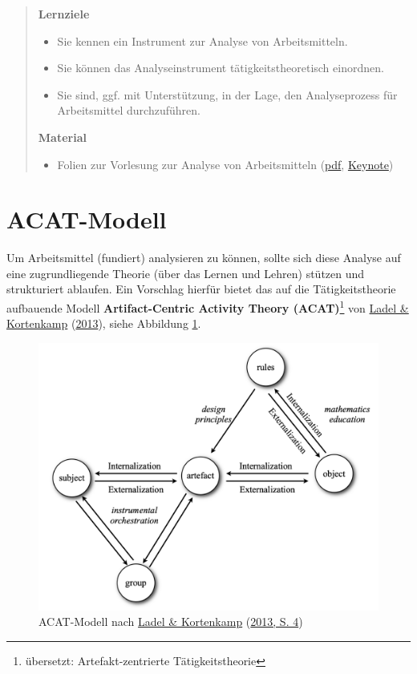 \documentclass[
  ngerman,
]{scrbook}
\providecommand{\tightlist}{%
  \setlength{\itemsep}{0pt}\setlength{\parskip}{0pt}}
\theoremstyle{definition}
\theoremstyle{definition}
\theoremstyle{definition}
\theoremstyle{definition}
\theoremstyle{remark}
\begin{document}
\begin{quote}
\textbf{Lernziele}

\begin{itemize}
\tightlist
\item
  Sie kennen ein Instrument zur Analyse von Arbeitsmitteln.
\item
  Sie können das Analyseinstrument tätigkeitstheoretisch einordnen.
\item
  Sie sind, ggf. mit Unterstützung, in der Lage, den Analyseprozess für Arbeitsmittel durchzuführen.
\end{itemize}

\textbf{Material}

\begin{itemize}
\tightlist
\item
  Folien zur Vorlesung zur Analyse von Arbeitsmitteln (\href{files/Stoffdidaktik-WiSe2122-Kap9.pdf}{pdf}, \href{files/Stoffdidaktik-WiSe2122-Kap9.key}{Keynote})
\end{itemize}
\end{quote}

\hypertarget{acat-modell}{%
\section{ACAT-Modell}\label{acat-modell}}

Um Arbeitsmittel (fundiert) analysieren zu können, sollte sich diese Analyse auf eine zugrundliegende Theorie (über das Lernen und Lehren) stützen und strukturiert ablaufen. Ein Vorschlag hierfür bietet das auf die Tätigkeitstheorie aufbauende Modell \textbf{Artifact-Centric Activity Theory (ACAT)}\footnote{übersetzt: Artefakt-zentrierte Tätigkeitstheorie} von \protect\hyperlink{ref-Ladel2013}{Ladel \& Kortenkamp} (\protect\hyperlink{ref-Ladel2013}{2013}), siehe Abbildung \ref{fig:ACAT}.



\begin{figure}

{\centering \includegraphics[width=0.75\linewidth]{pictures/9-ACAT} 

}

\caption{ACAT-Modell nach \protect\hyperlink{ref-Ladel2013}{Ladel \& Kortenkamp} (\protect\hyperlink{ref-Ladel2013}{2013, S. 4})}\label{fig:ACAT}
\end{figure}
\end{document}
